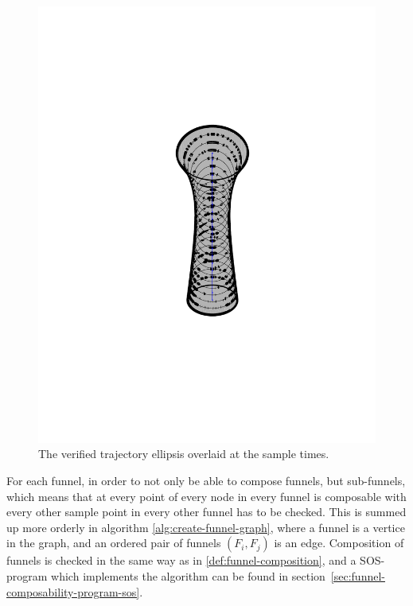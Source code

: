 \begin{figure}
\begin{minipage}[b]{0.4\textwidth}
    \includegraphics[width=\textwidth]{figures/method/funnel-sampled}
    \caption{The verified trajectory ellipsis overlaid at the sample times.}
  \end{minipage}
\end{figure}

For each funnel, in order to not only be able to compose funnels, but
sub-funnels, which means that at every point of every node in every funnel is
composable with every other sample point in every other funnel has to be
checked. This is summed up more orderly in algorithm
\ref{alg:create-funnel-graph}, where a funnel is a vertice in the graph, and an
ordered pair of funnels \(\left( F_{i}, F_{j} \right)\) is an edge. Composition
of funnels is checked in the same way as in \ref{def:funnel-composition}, and a
\ac{SOS}-program which implements the algorithm can be found in
section~\ref{sec:funnel-composability-program-sos}.

